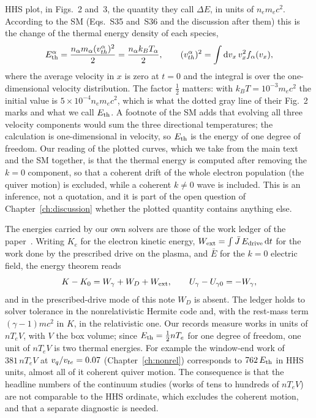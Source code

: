 HHS plot, in Figs.~2 and~3, the quantity they call $\Delta E$, in units of $n_em_ec^2$. According to the SM (Eqs.~S35 and~S36 and the discussion after them) this is the change of the thermal energy density of each species,
\begin{equation}
E_{\rm th}^{\alpha}=\frac{n_\alpha m_\alpha (v_{th}^\alpha)^2}{2}=\frac{n_\alpha k_BT_\alpha}{2},\qquad
(v_{th}^\alpha)^2=\int\mathrm dv_x\,v_x^2f_\alpha(v_x),
\label{eq:hhs-eth}
\end{equation}
where the average velocity in $x$ is zero at $t=0$ and the integral is over the one-dimensional velocity distribution. The factor $\tfrac12$ matters: with $k_BT=10^{-3}m_ec^2$ the initial value is $5\times10^{-4}n_em_ec^2$, which is what the dotted gray line of their Fig.~2 marks and what we call $E_{\rm th}$. A footnote of the SM adds that evolving all three velocity components would sum the three directional temperatures; the calculation is one-dimensional in velocity, so $E_{\rm th}$ is the energy of one degree of freedom. Our reading of the plotted curves, which we take from the main text and the SM together, is that the thermal energy is computed after removing the $k=0$ component, so that a coherent drift of the whole electron population (the quiver motion) is excluded, while a coherent $k\neq0$ wave is included. This is an inference, not a quotation, and it is part of the open question of Chapter~\ref{ch:discussion} whether the plotted quantity contains anything else.

The energies carried by our own solvers are those of the work ledger of the paper~\cite{DarkSPECTRAX}. Writing $K_e$ for the electron kinetic energy, $W_{\rm ext}=\int\bar J\,E_{\rm drive}\,\mathrm dt$ for the work done by the prescribed drive on the plasma, and $\bar E$ for the $k=0$ electric field, the energy theorem reads
\begin{equation}
K-K_0=W_\gamma+W_D+W_{\rm ext},\qquad U_\gamma-U_{\gamma0}=-W_\gamma,
\label{eq:ledger}
\end{equation}
and in the prescribed-drive mode of this note $W_D$ is absent. The ledger holds to solver tolerance in the nonrelativistic Hermite code and, with the rest-mass term $(\gamma-1)m c^2$ in $K$, in the relativistic one. Our records measure works in units of $n T_e V$, with $V$ the box volume; since $E_{\rm th}=\tfrac12nT_e$ for one degree of freedom, one unit of $nT_eV$ is two thermal energies. For example the window-end work of $381\,nT_eV$ at $v_q/v_{te}=0.07$ (Chapter~\ref{ch:nonrel}) corresponds to $762\,E_{\rm th}$ in HHS units, almost all of it coherent quiver motion. The consequence is that the headline numbers of the continuum studies (works of tens to hundreds of $nT_eV$) are not comparable to the HHS ordinate, which excludes the coherent motion, and that a separate diagnostic is needed.

